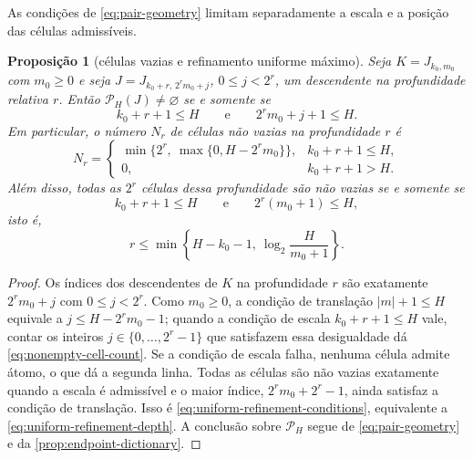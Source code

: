 \documentclass[11pt,a4paper]{article}
\newtheorem{proposition}[theorem]{Proposição}
\theoremstyle{definition}
\theoremstyle{remark}
\newcommand{\Pairs}{\mathcal{P}}
\begin{document}
As condições de \eqref{eq:pair-geometry} limitam separadamente a escala e a posição das células admissíveis.

\begin{proposition}[células vazias e refinamento uniforme máximo]
\label{prop:translation-obstruction}
Seja $K=J_{k_0,m_0}$ com $m_0\ge0$ e seja
$J=J_{k_0+r,\,2^rm_0+j}$, $0\le j<2^r$, um descendente na profundidade
relativa $r$. Então $\Pairs_H(J)\ne\varnothing$ se e somente se
\begin{equation}
 k_0+r+1\le H
 \qquad\text{e}\qquad
 2^rm_0+j+1\le H.
 \label{eq:two-obstructions}
\end{equation}
Em particular, o número $N_r$ de células não vazias na profundidade $r$ é
\begin{equation}
 N_r=
 \begin{cases}
 \min\{2^r,\ \max\{0,H-2^rm_0\}\},&k_0+r+1\le H,\\
 0,&k_0+r+1>H.
 \end{cases}
 \label{eq:nonempty-cell-count}
\end{equation}
Além disso, \emph{todas} as $2^r$ células dessa profundidade são não vazias
se e somente se
\begin{equation}
 k_0+r+1\le H
 \qquad\text{e}\qquad
 2^r(m_0+1)\le H,
 \label{eq:uniform-refinement-conditions}
\end{equation}
isto é,
\begin{equation}
 r\le
 \min\!\left\{H-k_0-1,\ \log_2\frac{H}{m_0+1}\right\}.
 \label{eq:uniform-refinement-depth}
\end{equation}
\end{proposition}

\begin{proof}
Os índices dos descendentes de $K$ na profundidade $r$ são exatamente
$2^rm_0+j$ com $0\le j<2^r$. Como $m_0\ge0$, a condição de translação
$|m|+1\le H$ equivale a $j\le H-2^rm_0-1$; quando a condição de escala
$k_0+r+1\le H$ vale, contar os inteiros $j\in\{0,\ldots,2^r-1\}$ que
satisfazem essa desigualdade dá \eqref{eq:nonempty-cell-count}. Se a condição
de escala falha, nenhuma célula admite átomo, o que dá a segunda linha.
Todas as células são não vazias exatamente quando a escala é admissível e o
maior índice, $2^rm_0+2^r-1$, ainda satisfaz a condição de translação. Isso é
\eqref{eq:uniform-refinement-conditions}, equivalente a
\eqref{eq:uniform-refinement-depth}. A conclusão sobre $\Pairs_H$ segue de
\eqref{eq:pair-geometry} e da \cref{prop:endpoint-dictionary}.
\end{proof}
\end{document}
